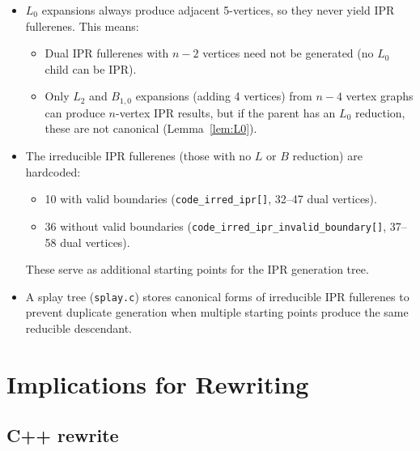 \documentclass[11pt,a4paper]{article}
\theoremstyle{definition}
\begin{document}
\begin{itemize}[nosep]
  \item $L_0$ expansions always produce adjacent 5-vertices, so they
    never yield IPR fullerenes.  This means:
    \begin{itemize}[nosep]
      \item Dual IPR fullerenes with $n{-}2$ vertices need not be
        generated (no $L_0$ child can be IPR).
      \item Only $L_2$ and $B_{1,0}$ expansions (adding 4 vertices)
        from $n{-}4$ vertex graphs can produce $n$-vertex IPR results,
        but if the parent has an $L_0$ reduction, these are not
        canonical (Lemma~\ref{lem:L0}).
    \end{itemize}

  \item The irreducible IPR fullerenes (those with no $L$ or $B$
    reduction) are hardcoded:
    \begin{itemize}[nosep]
      \item 10 with valid boundaries (\texttt{code\_irred\_ipr[]},
        32--47 dual vertices).
      \item 36 without valid boundaries
        (\texttt{code\_irred\_ipr\_invalid\_boundary[]}, 37--58 dual vertices).
    \end{itemize}
    These serve as additional starting points for the IPR generation
    tree.

  \item A splay tree (\texttt{splay.c}) stores canonical forms of
    irreducible IPR fullerenes to prevent duplicate generation when
    multiple starting points produce the same reducible descendant.
\end{itemize}

\section{Implications for Rewriting}
\label{sec:rewrite}

\subsection{C++ rewrite}
\end{document}

